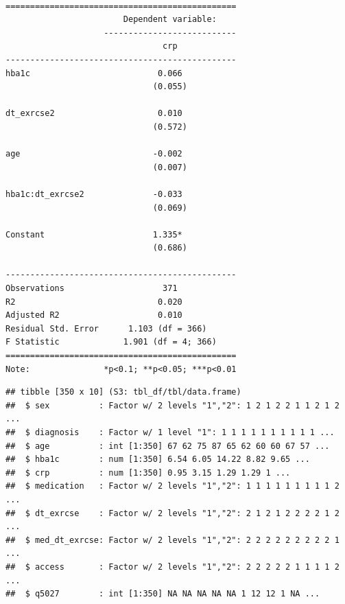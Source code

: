 \documentclass[
  man,floatsintext]{apa6}
\begin{document}
\begin{verbatim}

===============================================
                        Dependent variable:    
                    ---------------------------
                                crp            
-----------------------------------------------
hba1c                          0.066           
                              (0.055)          
                                               
dt_exrcse2                     0.010           
                              (0.572)          
                                               
age                           -0.002           
                              (0.007)          
                                               
hba1c:dt_exrcse2              -0.033           
                              (0.069)          
                                               
Constant                      1.335*           
                              (0.686)          
                                               
-----------------------------------------------
Observations                    371            
R2                             0.020           
Adjusted R2                    0.010           
Residual Std. Error      1.103 (df = 366)      
F Statistic             1.901 (df = 4; 366)    
===============================================
Note:               *p<0.1; **p<0.05; ***p<0.01
\end{verbatim}

\begin{verbatim}
## tibble [350 x 10] (S3: tbl_df/tbl/data.frame)
##  $ sex          : Factor w/ 2 levels "1","2": 1 2 1 2 2 1 1 2 1 2 ...
##  $ diagnosis    : Factor w/ 1 level "1": 1 1 1 1 1 1 1 1 1 1 ...
##  $ age          : int [1:350] 67 62 75 87 65 62 60 60 67 57 ...
##  $ hba1c        : num [1:350] 6.54 6.05 14.22 8.82 9.65 ...
##  $ crp          : num [1:350] 0.95 3.15 1.29 1.29 1 ...
##  $ medication   : Factor w/ 2 levels "1","2": 1 1 1 1 1 1 1 1 1 2 ...
##  $ dt_exrcse    : Factor w/ 2 levels "1","2": 2 1 2 1 2 2 2 2 1 2 ...
##  $ med_dt_exrcse: Factor w/ 2 levels "1","2": 2 2 2 2 2 2 2 2 2 1 ...
##  $ access       : Factor w/ 2 levels "1","2": 2 2 2 2 2 1 1 1 1 2 ...
##  $ q5027        : int [1:350] NA NA NA NA NA 1 12 12 1 NA ...
\end{verbatim}
\end{document}
